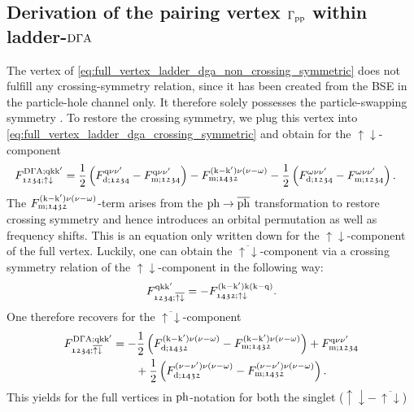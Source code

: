 \documentclass[../../main.tex]{subfiles}
\begin{document}
\subsection{Derivation of the pairing vertex $\Gamma_{\text{pp}}$ within ladder-$\text{D}\Gamma\text{A}$}

The vertex of \eqref{eq:full_vertex_ladder_dga_non_crossing_symmetric} does not fulfill any crossing-symmetry relation, since it has been created from the BSE in the particle-hole channel only. It therefore solely possesses the particle-swapping symmetry \cite{ab initio dga}. To restore the crossing symmetry, we plug this vertex into \eqref{eq:full_vertex_ladder_dga_crossing_symmetric} and obtain for the $\uparrow\downarrow$-component \cite{ab initio dga, rohringer thesis}
\begin{align}
	F^{\text{D}\Gamma\text{A};\text{q}\text{k}\text{k}'}_{\mathfrak{1234};\uparrow\downarrow}&=\frac12\left (F_{\text{d};\mathfrak{1234}}^{\text{q}\nu\nu'}-F_{\text{m};\mathfrak{1234}}^{\text{q}\nu\nu'}\right )-F_{\text{m};\mathfrak{1432}}^{(\text{k}-\text{k}')\nu(\nu-\omega)}-\frac12\left (F_{\text{d};\mathfrak{1234}}^{\omega\nu\nu'}-F_{\text{m};\mathfrak{1234}}^{\omega\nu\nu'}\right ).
\end{align}
The $F_{\text{m};\mathfrak{1432}}^{(\text{k}-\text{k}')\nu(\nu-\omega)}$-term arises from the $\text{ph}\to\overline{\text{ph}}$ transformation to restore crossing symmetry and hence introduces an orbital permutation as well as frequency shifts. This is an equation only written down for the $\uparrow\downarrow$-component of the full vertex. Luckily, one can obtain the $\overline{\uparrow\downarrow}$-component via a crossing symmetry relation of the $\uparrow\downarrow$-component in the following way:
\begin{align}
	F^{\text{q}\text{k}\text{k}'}_{\mathfrak{1234};\overline{\uparrow\downarrow}}=-F^{(\text{k}-\text{k}')\text{k}(\text{k}-\text{q})}_{\mathfrak{1432};\uparrow\downarrow}.
\end{align}
One therefore recovers for the $\overline{\uparrow\downarrow}$-component
\begin{align}
\begin{split}
	F^{\text{D}\Gamma\text{A};\text{q}\text{k}\text{k}'}_{\mathfrak{1234};\overline{\uparrow\downarrow}}&=-\frac12\left (F_{\text{d};\mathfrak{1432}}^{(\text{k}-\text{k}')\nu(\nu-\omega)}-F_{\text{m};\mathfrak{1432}}^{(\text{k}-\text{k}')\nu(\nu-\omega)}\right )+F_{\text{m};\mathfrak{1234}}^{\text{q}\nu\nu'}\\
	&\qquad+\frac12\left (F_{\text{d};\mathfrak{1432}}^{(\nu-\nu')\nu(\nu-\omega)}-F_{\text{m};\mathfrak{1432}}^{(\nu-\nu')\nu(\nu-\omega)}\right ).
\end{split}
\end{align}
This yields for the full vertices in $\text{ph}$-notation for both the singlet ($\uparrow\downarrow-\,\overline{\uparrow\downarrow}$)
\end{document}
